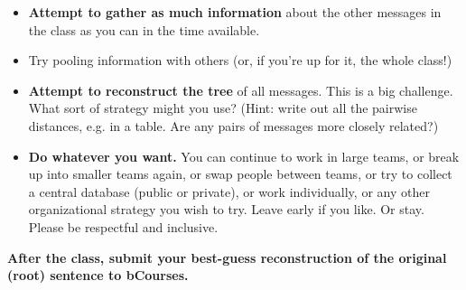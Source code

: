 \documentclass[10pt,letterpaper,english]{article}
\begin{document}
{\begin{itemize}
  \begin{itemize}
\item {\bf Attempt to gather as much information} about the other messages in the class as you can in the time available.
\item Try pooling information with others (or, if you're up for it, the whole class!)
\item {\bf Attempt to reconstruct the tree} of all messages. This is a big challenge.
  What sort of strategy might you use? (Hint: write out all the pairwise distances, e.g. in a table. Are any pairs of messages more closely related?)
\item {\bf Do whatever you want.} You can continue to work in large teams, or break up into smaller teams again, or swap people between teams, or try to collect a central database (public or private), or work individually, or any other organizational strategy you wish to try. Leave early if you like. Or stay. Please be respectful and inclusive.
  \end{itemize}
\end{itemize}

\noindent
{\bf After the class, submit your best-guess reconstruction of the original (root) sentence to bCourses.}


}

\generatepages
\end{document}
